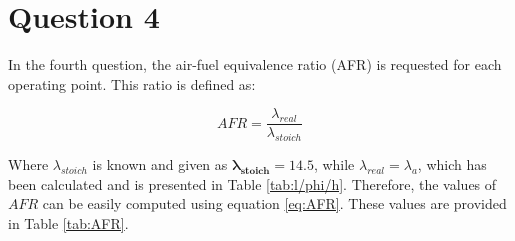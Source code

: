 \documentclass{report}
\begin{document}



\newpage
\section{Question 4}

In the fourth question, the air-fuel equivalence ratio (AFR) is requested for each operating point. This ratio is defined as:

\begin{equation}
    \label{eq:AFR}
    AFR=\frac{\lambda_{real}}{\lambda_{stoich}}
\end{equation}

Where $\lambda_{stoich}$ is known and given as $\boldsymbol{\lambda_{stoich}=14.5}$, while $\lambda_{real}=\lambda_a$, which has been calculated and is presented in Table \ref{tab:l/phi/h}. Therefore, the values of $AFR$ can be easily computed using equation \ref{eq:AFR}. These values are provided in Table \ref{tab:AFR}.
\end{document}
